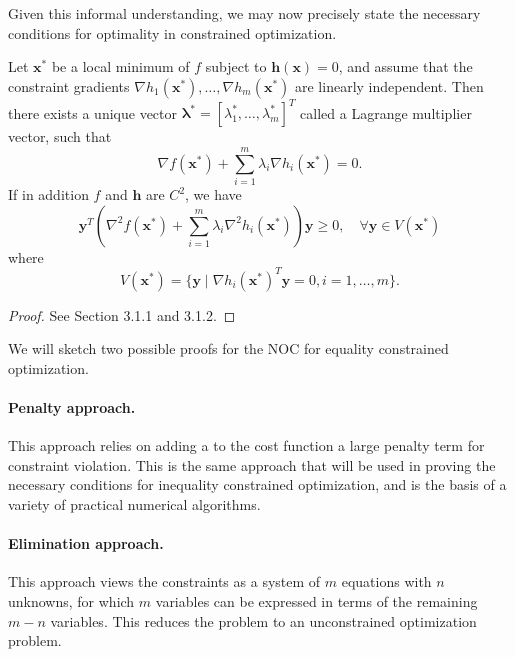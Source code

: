 Given this informal understanding, we may now precisely state the necessary conditions for optimality in constrained optimization. 

\begin{theorem}
\label{thm:eq_con_NOC}
Let $\bm{x}^*$ be a local minimum of $f$ subject to $\bm{h}(\bm{x}) = 0$, and assume that the constraint gradients $\nabla h_1(\bm{x}^*),\ldots,\nabla h_m(\bm{x}^*)$ are linearly independent. Then there exists a unique vector $\bm{\lambda}^* = [\lambda_1^*,\ldots,\lambda_m^*]^T$ called a Lagrange multiplier vector, such that
\begin{equation}
    \nabla f(\bm{x}^*) + \sum^m_{i=1} \lambda_i \nabla h_i(\bm{x}^*) = 0.
\end{equation}
If in addition $f$ and $\bm{h}$ are $C^2$, we have 
\begin{equation}
    \bm{y}^T (\nabla^2 f(\bm{x}^*) + \sum^m_{i=1} \lambda_i \nabla^2 h_i(\bm{x}^*)) \bm{y} \geq 0, \quad \forall \bm{y} \in V(\bm{x}^*) 
\end{equation}
where
\begin{equation}
    V(\bm{x}^*) = \{\bm{y} \mid \nabla h_i(\bm{x}^*)^T \bm{y} = 0, i=1,\ldots,m\}.
\end{equation}
\end{theorem}

\begin{proof}
See \cite{bertsekas2016nonlinear} Section 3.1.1 and 3.1.2.
\end{proof}

We will sketch two possible proofs for the NOC for equality constrained optimization. 

\paragraph{Penalty approach.} This approach relies on adding a to the cost function a large penalty term for constraint violation. This is the same approach that will be used in proving the necessary conditions for inequality constrained optimization, and is the basis of a variety of practical numerical algorithms. 

\paragraph{Elimination approach.} This approach views the constraints as a system of $m$ equations with $n$ unknowns, for which $m$ variables can be expressed in terms of the remaining $m-n$ variables. This reduces the problem to an unconstrained optimization problem. 

